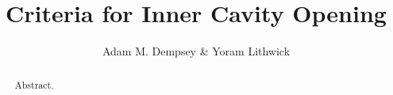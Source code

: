 \documentclass[iop,onecolumn,numberedappendix,appendixfloats]{emulateapj}
\begin{document}
\title{Criteria for Inner Cavity Opening}
\author{Adam M. Dempsey \& Yoram Lithwick}

\begin{abstract}
Abstract.
\end{abstract}

\maketitle









\acknowledgments{
}



\begin{appendix}

\end{appendix}
\end{document}
